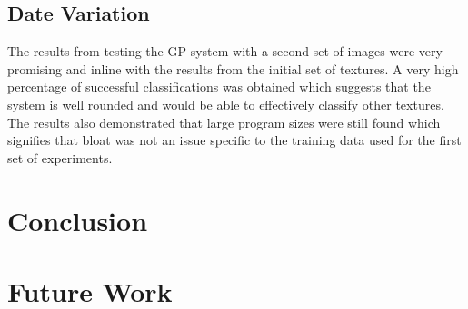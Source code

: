 \documentclass[titlepage,letterpaper]{article}
\begin{document}
\subsection{Date Variation}
\label{sec:variationDiscussion}
The results from testing the GP system with a second set of images were very promising and inline with the results from the initial set of textures. A very high percentage of successful classifications was obtained which suggests that the system is well rounded and would be able to effectively classify other textures. The results also demonstrated that large program sizes were still found which signifies that bloat was not an issue specific to the training data used for the first set of experiments.

\section{Conclusion}
\label{sec:Conclusion}


\section{Future Work}
\label{sec:FutureWork}


{}

\end{document}
